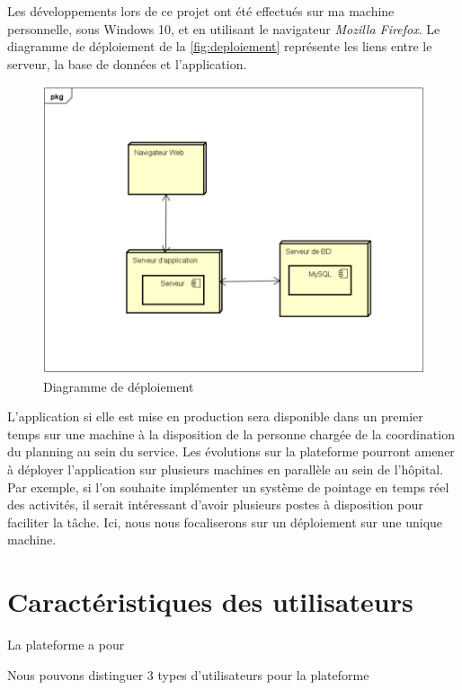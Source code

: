 \documentclass{polytech/polytech}
\begin{document}
Les développements lors de ce projet ont été effectués sur ma machine personnelle, sous Windows 10, et en utilisant le navigateur \textit{Mozilla Firefox}. Le diagramme de déploiement de la \autoref{fig:deploiement} représente les liens entre le serveur, la base de données et l'application. 

\begin{figure}
	\includegraphics[scale=0.8]{images/deploiement}
	\caption{Diagramme de déploiement}
	\label{fig:deploiement}
\end{figure}

L'application si elle est mise en production sera disponible dans un premier temps sur une machine à la disposition de la personne chargée de la coordination du planning au sein du service. Les évolutions sur la plateforme pourront amener à déployer l'application sur plusieurs machines en parallèle au sein de l'hôpital. Par exemple, si l'on souhaite implémenter un système de pointage en temps réel des activités, il serait intéressant d'avoir plusieurs postes à disposition pour faciliter la tâche. Ici, nous nous focaliserons sur un déploiement sur une unique machine. 


\section{Caractéristiques des utilisateurs}


La plateforme a pour 

Nous pouvons distinguer 3 types d'utilisateurs pour la plateforme

\end{document}
